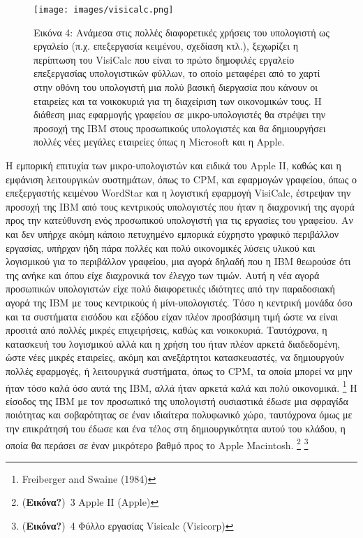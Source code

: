 \documentclass[
]{article}
\begin{document}
\leavevmode{}%
\begin{figure}
\hypertarget{fig:visicalc}{%
\centering
\texttt{[image: images/visicalc.png]}
\caption{Εικόνα 4: Ανάμεσα στις πολλές διαφορετικές χρήσεις του
υπολογιστή ως εργαλείο (π.χ. επεξεργασία κειμένου, σχεδίαση κτλ.),
ξεχωρίζει η περίπτωση του VisiCalc που είναι το πρώτο δημοφιλές εργαλείο
επεξεργασίας υπολογιστικών φύλλων, το οποίο μεταφέρει από το χαρτί στην
οθόνη του υπολογιστή μια πολύ βασική διεργασία που κάνουν οι εταιρείες
και τα νοικοκυριά για τη διαχείριση των οικονομικών τους. Η διάθεση μιας
εφαρμογής γραφείου σε μικρο-υπολογιστές θα στρέψει την προσοχή της IBM
στους προσωπικούς υπολογιστές και θα δημιουργήσει πολλές νέες μεγάλες
εταιρείες όπως η Microsoft και η Apple.}\label{fig:visicalc}
}
\end{figure}

Η εμπορική επιτυχία των μικρο-υπολογιστών και ειδικά του Apple II, καθώς
και η εμφάνιση λειτουργικών συστημάτων, όπως το CPΜ, και εφαρμογών
γραφείου, όπως ο επεξεργαστής κειμένου WordStar και η λογιστική εφαρμογή
VisiCalc, έστρεψαν την προσοχή της IBM από τους κεντρικούς υπολογιστές
που ήταν η διαχρονική της αγορά προς την κατεύθυνση ενός προσωπικού
υπολογιστή για τις εργασίες του γραφείου. Αν και δεν υπήρχε ακόμη κάποιο
πετυχημένο εμπορικά εύχρηστο γραφικό περιβάλλον εργασίας, υπήρχαν ήδη
πάρα πολλές και πολύ οικονομικές λύσεις υλικού και λογισμικού για το
περιβάλλον γραφείου, μια αγορά δηλαδή που η IBM θεωρούσε ότι της ανήκε
και όπου είχε διαχρονικά τον έλεγχο των τιμών. Αυτή η νέα αγορά
προσωπικών υπολογιστών είχε πολύ διαφορετικές ιδιότητες από την
παραδοσιακή αγορά της IBM με τους κεντρικούς ή μίνι-υπολογιστές. Τόσο η
κεντρική μονάδα όσο και τα συστήματα εισόδου και εξόδου είχαν πλέον
προσβάσιμη τιμή ώστε να είναι προσιτά από πολλές μικρές επιχειρήσεις,
καθώς και νοικοκυριά. Ταυτόχρονα, η κατασκευή του λογισμικού αλλά και η
χρήση του ήταν πλέον αρκετά διαδεδομένη, ώστε νέες μικρές εταιρείες,
ακόμη και ανεξάρτητοι κατασκευαστές, να δημιουργούν πολλές εφαρμογές, ή
λειτουργικά συστήματα, όπως το CPM, τα οποία μπορεί να μην ήταν τόσο
καλά όσο αυτά της IBM, αλλά ήταν αρκετά καλά και πολύ οικονομικά.
\footnote{Freiberger and Swaine (1984)} Η είσοδος της IBM με τον
προσωπικό της υπολογιστή ουσιαστικά έδωσε μια σφραγίδα ποιότητας και
σοβαρότητας σε έναν ιδιαίτερα πολυφωνικό χώρο, ταυτόχρονα όμως με την
επικράτησή του έδωσε και ένα τέλος στη δημιουργικότητα αυτού του κλάδου,
η οποία θα περάσει σε έναν μικρότερο βαθμό προς το Apple Macintosh.
\footnote{(\textbf{Εικόνα?})~3 Apple II (Apple)} \footnote{(\textbf{Εικόνα?})~4
  Φύλλο εργασίας Visicalc (Visicorp)}
\end{document}
